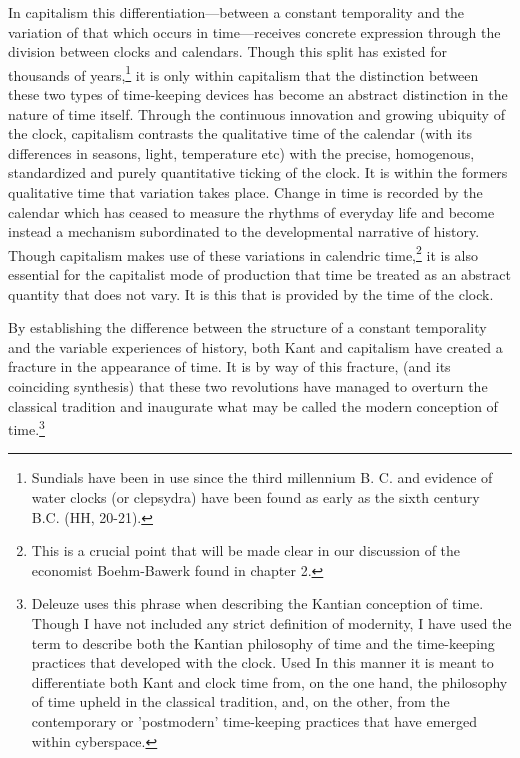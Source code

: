In capitalism this differentiation---between a constant temporality and the variation of that which occurs in time---receives concrete expression through the division between clocks and calendars. Though this split has existed for thousands of years,\footnote{Sundials have been in use since the third millennium B. C. and evidence of water clocks (or clepsydra) have been found as early as the sixth century B.C. (HH, 20-21).} it is only within capitalism that the distinction between these two types of time-keeping devices has become an abstract distinction in the nature of time itself. Through the continuous innovation and growing ubiquity of the clock, capitalism contrasts the qualitative time of the calendar (with its differences in seasons, light, temperature etc) with the precise, homogenous, standardized and purely quantitative ticking of the clock. It is within the formers qualitative time that variation takes place. Change in time is recorded by the calendar which has ceased to measure the rhythms of everyday life and become instead a mechanism subordinated to the developmental narrative of history. Though capitalism makes use of these  variations in calendric time,\footnote{This is a crucial point that will be made clear in our discussion of the economist Boehm-Bawerk found in chapter 2.} it is also essential for the capitalist mode of production that time be treated as an abstract quantity that does not vary. It is this that is provided by the time of the clock. 

By establishing the difference between the structure of a constant temporality and the variable experiences of history, both Kant and capitalism have created a fracture in the appearance of time. It is by way of this fracture, (and its coinciding synthesis) that these two revolutions have managed to overturn the classical tradition and inaugurate what may be called the modern conception of time.\footnote{Deleuze uses this phrase when describing the Kantian conception of time. Though I have not included any strict definition of modernity, I have used the term to describe both the Kantian philosophy of time and the time-keeping practices that developed with the clock. Used In this manner it is meant to differentiate both Kant and clock time from, on the one hand, the philosophy of time upheld in the classical tradition, and, on the other, from the contemporary or 'postmodern' time-keeping practices that have emerged within cyberspace.}

